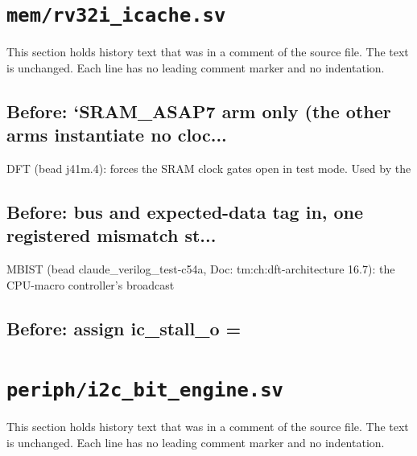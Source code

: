 \section{\texttt{mem/rv32i\_icache.sv}}\label{cr:mod:rv32i-icache}

This section holds history text that was in a comment of the source file. The text is unchanged. Each line has no leading comment marker and no indentation.

\begin{record}

\subsection*{Before: `SRAM\_ASAP7 arm only (the other arms instantiate no cloc...}

\begin{textblock}
DFT (bead j41m.4): forces the SRAM clock gates open in test mode. Used by the
\end{textblock}

\subsection*{Before: bus and expected-data tag in, one registered mismatch st...}

\begin{textblock}
MBIST (bead claude_verilog_test-c54a, Doc: tm:ch:dft-architecture 16.7): the CPU-macro controller's broadcast
\end{textblock}

\subsection*{Before: assign ic\_stall\_o =}


\end{record}

\section{\texttt{periph/i2c\_bit\_engine.sv}}\label{cr:mod:i2c-bit-engine}

This section holds history text that was in a comment of the source file. The text is unchanged. Each line has no leading comment marker and no indentation.

